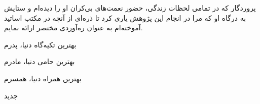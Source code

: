 


\begin{center}


پروردگار که در تمامی لحظات زندگی، حضور نعمت‌های بی‌کران او را دیده‌ام و ستایش به درگاه او که مرا در انجام این پژوهش یاری کرد تا ذره‌ای از آنچه در مکتب اساتید آموخته‌ام به عنوان ره‌آوردی مختصر ارائه نمایم.


بهترین تکیه‌گاه دنیا، پدرم

بهترین حامی دنیا، مادرم

بهترین همراه دنیا، همسرم

\end{center}

‌جدید
